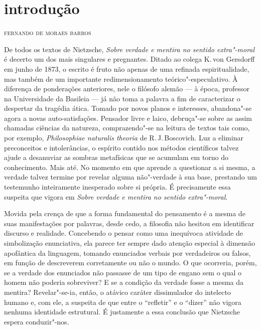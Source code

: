 \chapter[Introdução, por Fernando de Moraes Barros]{introdução}

\begin{flushright}
\textsc{fernando de moraes barros}
\end{flushright}

De todos os textos de Nietzsche, \textit{Sobre verdade e mentira no sentido
extra"-moral} é decerto um dos mais singulares e pregnantes. Ditado ao
colega K.\,von Gersdorff em junho de 1873, o escrito é fruto não apenas
de uma refinada espiritualidade, mas também de um importante
redimensionamento teórico"-especulativo. À diferença de ponderações
anteriores, nele o filósofo alemão --- à época, professor na Universidade
da Basileia --- já não toma a palavra a fim de caracterizar o despertar
da tragédia ática. Tomado por novos planos e interesses,
abandona"-se agora a novas auto{}-satisfações. Pensador livre e laico,
debruça"-se sobre as assim chamadas ciências da natureza,
comprazendo"-se na leitura de textos tais como, por exemplo,
\textit{Philosophiae naturalis theoria} de R.\,J.\,Boscovich. Luz a
eliminar preconceitos e intolerâncias, o espírito contido nos métodos científicos
talvez ajude a desanuviar as sombras metafísicas que se acumulam em
torno do conhecimento. Mais até. No momento em que aprende a questionar
a si mesma, a verdade talvez termine por revelar alguma não"-verdade à
sua base, prestando um testemunho inteiramente inesperado sobre si
própria. É precisamente essa suspeita que vigora em \textit{Sobre
verdade e mentira no sentido extra"-moral}.

Movida pela crença de que a forma fundamental do pensamento é a mesma
de suas manifestações por palavras, desde cedo, a filosofia não hesitou em
identificar discurso e realidade. Concebendo o pensar como uma
inequívoca atividade de simbolização enunciativa, ela parece ter sempre
dado atenção especial à dimensão apofântica da linguagem, tomando
enunciados verbais por verdadeiros ou falsos, em função de descreverem
corretamente ou não o mundo. O que ocorreria, porém, se a verdade dos
enunciados não passasse de um tipo de engano sem o qual o homem não
poderia sobreviver? E se a condição da verdade fosse a mesma da
mentira? Revelar"-se{}-ia, então, o atávico caráter dissimulador do
intelecto humano e, com ele, a suspeita de que entre o “refletir” e o
“dizer” não vigora nenhuma identidade estrutural. É justamente a essa
conclusão que Nietzsche espera conduzir"-nos.

